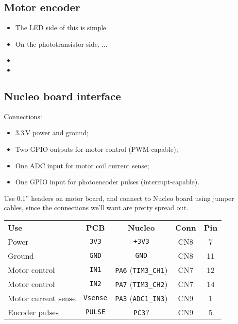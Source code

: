 \documentclass[a4paper,11pt,article]{memoir}
\begin{document}
\subsection*{Motor encoder}

\begin{itemize}
  \item{The LED side of this is simple.}
  \item{On the phototransistor side, ...}
  \item{}
  \item{}
\end{itemize}

\subsection*{Nucleo board interface}

Connections:
\begin{itemize}
  \item{3.3\,V power and ground;}
  \item{Two GPIO outputs for motor control (PWM-capable);}
  \item{One ADC input for motor coil current sense;}
  \item{One GPIO input for photoencoder pulses (interrupt-capable).}
\end{itemize}

Use 0.1'' headers on motor board, and connect to Nucleo board using
jumper cables, since the connections we'll want are pretty spread out.

\begin{center}
  \begin{tabular}{lcccc}
    \textbf{Use} & \textbf{PCB} & \textbf{Nucleo} & \textbf{Conn} & \textbf{Pin} \\
    Power  & \texttt{3V3} & \texttt{+3V3} & CN8 & 7\\
    Ground & \texttt{GND} & \texttt{GND} & CN8 & 11 \\
    Motor control & \texttt{IN1} & \texttt{PA6} (\texttt{TIM3\_CH1}) & CN7 & 12 \\
    Motor control & \texttt{IN2} & \texttt{PA7} (\texttt{TIM3\_CH2}) & CN7 & 14 \\
    Motor current sense & \texttt{Vsense} & \texttt{PA3} (\texttt{ADC1\_IN3}) & CN9 & 1 \\
    Encoder pulses & \texttt{PULSE} & \texttt{PC3}? & CN9 & 5 \\
  \end{tabular}
\end{center}
\end{document}

